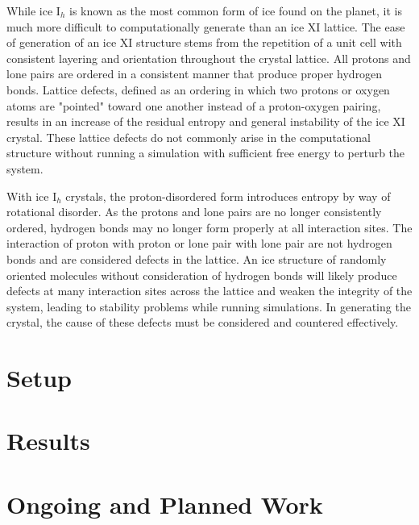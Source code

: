 While ice I$_{h}$ is known as the most common form of ice found on the planet, it is much more difficult to computationally generate than an ice XI lattice. 
The ease of generation of an ice XI structure stems from the repetition of a unit cell with consistent layering and orientation throughout the crystal lattice. 
All protons and lone pairs are ordered in a consistent manner that produce proper hydrogen bonds. 
Lattice defects, defined as an ordering in which two protons  or oxygen atoms are "pointed" toward one another instead of a proton-oxygen pairing, results in an increase of the residual entropy and general instability of the ice XI crystal. 
These lattice defects do not commonly arise in the computational structure without running a simulation with sufficient free energy to perturb the system.

With ice I$_{h}$ crystals, the proton-disordered form introduces entropy by way of rotational disorder. 
As the protons and lone pairs are no longer consistently ordered, hydrogen bonds may no longer form properly at all interaction sites. 
The interaction of proton with proton or lone pair with lone pair are not hydrogen bonds and are considered defects in the lattice. 
An ice structure of randomly oriented molecules without consideration of hydrogen bonds will likely produce defects at many interaction sites across the lattice and weaken the integrity of the system, leading to stability problems while running simulations. 
In generating the crystal, the cause of these defects must be considered and countered effectively.



\section{Setup}

\section{Results}

\section{Ongoing and Planned Work}